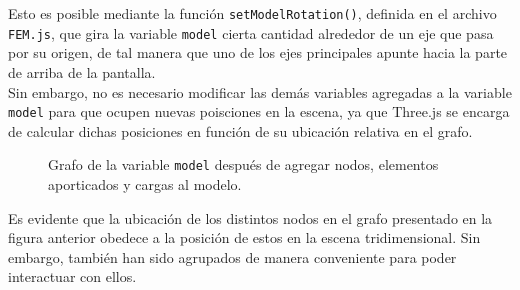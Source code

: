 Esto es posible mediante la función \verb|setModelRotation()|, definida en el archivo \verb|FEM.js|, que gira la variable \verb|model| cierta cantidad alrededor de un eje que pasa por su origen, de tal manera que uno de los ejes principales apunte hacia la parte de arriba de la pantalla.\\

Sin embargo, no es necesario modificar las demás variables agregadas a la variable \verb|model| para que ocupen nuevas poisciones en la escena, ya que Three.js se encarga de calcular dichas posiciones en función de su ubicación relativa en el grafo.\\

\begin{figure}[H]
  \centering
        \caption{Grafo de la variable \texttt{model} después de agregar nodos, elementos aporticados y cargas al modelo.}
        \label{fig:FEM.js-model}
      \end{figure}
      
\pagebreak

Es evidente que la ubicación de los distintos nodos en el grafo presentado en la figura anterior obedece a la posición de estos en la escena tridimensional. Sin embargo, también han sido agrupados de manera conveniente para poder interactuar con ellos.\\

